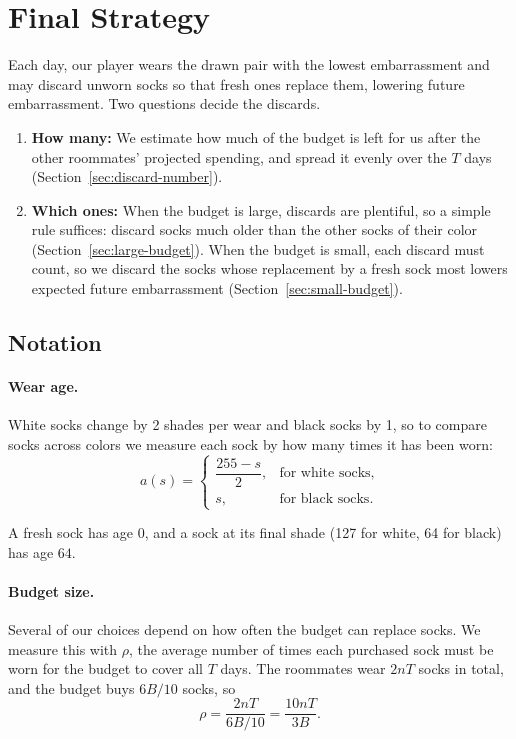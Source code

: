 \documentclass[11pt]{article}
\begin{document}
\section{Final Strategy}

Each day, our player wears the drawn pair with the lowest embarrassment and may discard unworn socks so that fresh ones replace them, lowering future embarrassment. Two questions decide the discards.

\begin{enumerate}[label=(\arabic*)]
    \item \textbf{How many:} We estimate how much of the budget is left for us after the other roommates' projected spending, and spread it evenly over the \(T\) days (Section~\ref{sec:discard-number}).
    \item \textbf{Which ones:} When the budget is large, discards are plentiful, so a simple rule suffices: discard socks much older than the other socks of their color (Section~\ref{sec:large-budget}). When the budget is small, each discard must count, so we discard the socks whose replacement by a fresh sock most lowers expected future embarrassment (Section~\ref{sec:small-budget}).
\end{enumerate}

\subsection{Notation}
\label{sec:notation}


\paragraph{Wear age.}
White socks change by 2 shades per wear and black socks by 1, so to compare socks across colors we measure each sock by how many times it has been worn:
\[
a(s)=
\begin{cases}
\dfrac{255-s}{2}, & \text{for white socks},\\[6pt]
s, & \text{for black socks}.
\end{cases}
\]

A fresh sock has age \(0\), and a sock at its final shade (127 for white, 64 for black) has age \(64\).

\paragraph{Budget size.}
Several of our choices depend on how often the budget can replace socks. We measure this with \(\rho\), the average number of times each purchased sock must be worn for the budget to cover all \(T\) days. The roommates wear \(2nT\) socks in total, and the budget buys \(6B/10\) socks, so
\[
\rho
=
\frac{2nT}{6B/10}
=
\frac{10nT}{3B}.
\]
\end{document}

